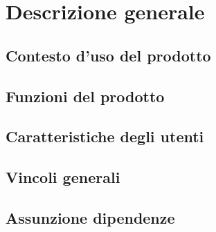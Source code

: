 \newpage
\section{Descrizione generale}
\subsection{Contesto d'uso del prodotto}
\subsection{Funzioni del prodotto}
\subsection{Caratteristiche degli utenti}
\subsection{Vincoli generali}
\subsection{Assunzione dipendenze}